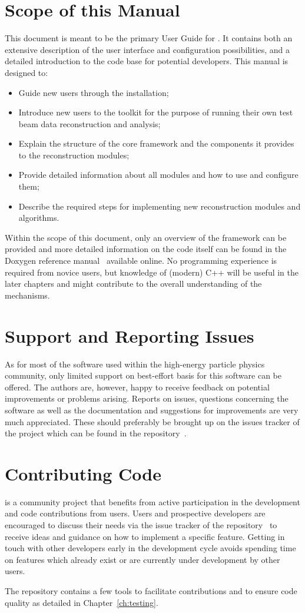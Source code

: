 \section{Scope of this Manual}
This document is meant to be the primary User Guide for \corry.
It contains both an extensive description of the user interface and configuration possibilities, and a detailed introduction to the code base for potential developers.
This manual is designed to:
\begin{itemize}
\item Guide new users through the installation;
\item Introduce new users to the toolkit for the purpose of running their own test beam data reconstruction and analysis;
\item Explain the structure of the core framework and the components it provides to the reconstruction modules;
\item Provide detailed information about all modules and how to use and configure them;
\item Describe the required steps for implementing new reconstruction modules and algorithms.
\end{itemize}

Within the scope of this document, only an overview of the framework can be provided and more detailed information on the code itself can be found in the Doxygen reference manual~\cite{corry-doxygen} available online.
No programming experience is required from novice users, but knowledge of (modern) C++ will be useful in the later chapters and might contribute to the overall understanding of the mechanisms.

\section{Support and Reporting Issues}
As for most of the software used within the high-energy particle physics community, only limited support on best-effort basis for this software can be offered.
The authors are, however, happy to receive feedback on potential improvements or problems arising.
Reports on issues, questions concerning the software as well as the documentation and suggestions for improvements are very much appreciated.
These should preferably be brought up on the issues tracker of the project which can be found in the repository~\cite{corry-issue-tracker}.


\section{Contributing Code}
\corry is a community project that benefits from active participation in the development and code contributions from users.
Users and prospective developers are encouraged to discuss their needs via the issue tracker of the repository~\cite{corry-issue-tracker} to receive ideas and guidance on how to implement a specific feature.
Getting in touch with other developers early in the development cycle avoids spending time on features which already exist or are currently under development by other users.

The repository contains a few tools to facilitate contributions and to ensure code quality as detailed in Chapter~\ref{ch:testing}.

